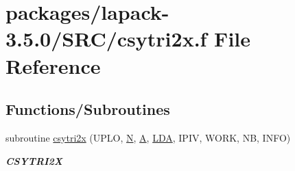 \hypertarget{csytri2x_8f}{}\section{packages/lapack-\/3.5.0/\+S\+R\+C/csytri2x.f File Reference}
\label{csytri2x_8f}
\subsection*{Functions/\+Subroutines}
\begin{DoxyCompactItemize}
\item 
subroutine \hyperlink{group__complexSYcomputational_gad885e99b62087bfc142f1ca6e51f6941}{csytri2x} (U\+P\+L\+O, \hyperlink{polmisc_8c_a0240ac851181b84ac374872dc5434ee4}{N}, \hyperlink{classA}{A}, \hyperlink{example__user_8c_ae946da542ce0db94dced19b2ecefd1aa}{L\+D\+A}, I\+P\+I\+V, W\+O\+R\+K, N\+B, I\+N\+F\+O)
\begin{DoxyCompactList}\small\item\em {\bfseries C\+S\+Y\+T\+R\+I2\+X} \end{DoxyCompactList}\end{DoxyCompactItemize}
